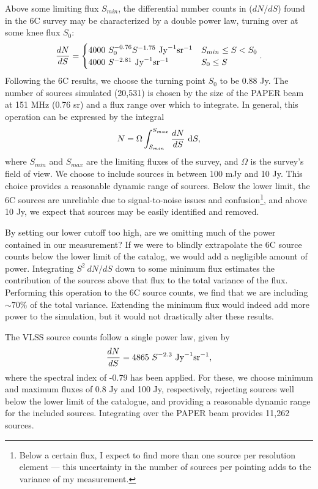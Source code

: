 Above some limiting flux $S_{min}$, the differential number counts in ($dN/dS$) found in the 6C survey 
may be characterized by a double power law, turning over at some knee flux $S_0$:
\begin{equation}
  \frac{d N}{d S} = \begin{cases}
    4000\ S_0^{-0.76}S^{-1.75}\ {\rm Jy}^{-1}{\rm sr}^{-1} & S_{min} \le S < S_0 \\
    4000\ S^{-2.81}\ {\rm Jy}^{-1}{\rm sr}^{-1} & S_0 \le S
  \end{cases}.
\end{equation}
Following the 6C results, we choose the turning point $S_0$ to be 0.88 Jy. The number of sources
simulated (20,531) is chosen by the size of the PAPER beam at 151 MHz (0.76 sr) and a flux range
over which to integrate. In general, this operation can be expressed by the integral
\begin{equation}
  N = \Omega \int_{S_{min}}^{S_{max}} \frac{d N}{d S}\ \mathrm{d}S,
\end{equation}
where $S_{min}$ and $S_{max}$ are the limiting fluxes of the survey, and $\Omega$ is the survey's field of
view. We choose to include sources in between 100 mJy and 10 Jy. This choice provides a reasonable
dynamic range of sources. Below the lower limit, the 6C sources are unreliable due to
signal-to-noise issues and confusion\footnote{Below a certain flux, I expect to
find more than one source per resolution element --- this uncertainty in the number of sources per
pointing adds to the variance of my measurement.}, and above 10 Jy, we expect that sources may be 
easily identified and removed.

By setting our lower cutoff too high, are we omitting much of the power contained in our
measurement? If we were to blindly extrapolate the 6C source counts below the lower limit of the catalog, we
would add a negligible amount of power. Integrating $S^2\ dN/dS$ down to some minimum flux estimates
the contribution of the sources above that flux to the total variance of the flux. Performing this
operation to the 6C source counts, we find that we are including $\sim70\%$ of the total variance.
Extending the minimum flux would indeed add more power to the simulation, but it would not
drastically alter these results.

The VLSS source counts follow a single power law, given by 
\begin{equation}
  \frac{d N}{d S} = 4865\ S^{-2.3}\ {\rm Jy}^{-1}{\rm sr}^{-1},
\end{equation}
where the spectral index of -0.79 has been applied. For these, we choose minimum and maximum fluxes
of 0.8 Jy and 100 Jy, respectively, rejecting sources well below the lower limit of the catalogue,
and providing a reasonable dynamic range for the included sources. Integrating over the PAPER beam
provides 11,262 sources.

